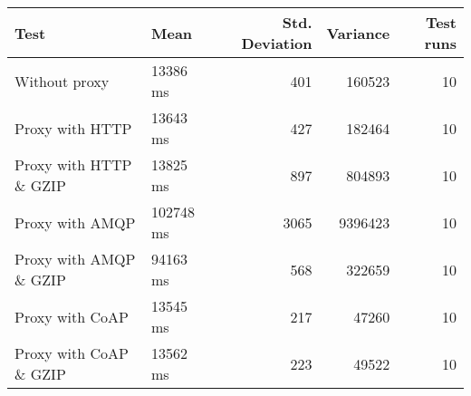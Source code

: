 \begin{tabular}{llrrr}
\hline
 Test                   & Mean      &   Std. Deviation &   Variance &   Test runs \\
\hline
 Without proxy          & 13386 ms  &              401 &     160523 &          10 \\
 Proxy with HTTP        & 13643 ms  &              427 &     182464 &          10 \\
 Proxy with HTTP \& GZIP & 13825 ms  &              897 &     804893 &          10 \\
 Proxy with AMQP        & 102748 ms &             3065 &    9396423 &          10 \\
 Proxy with AMQP \& GZIP & 94163 ms  &              568 &     322659 &          10 \\
 Proxy with CoAP        & 13545 ms  &              217 &      47260 &          10 \\
 Proxy with CoAP \& GZIP & 13562 ms  &              223 &      49522 &          10 \\
\hline
\end{tabular}